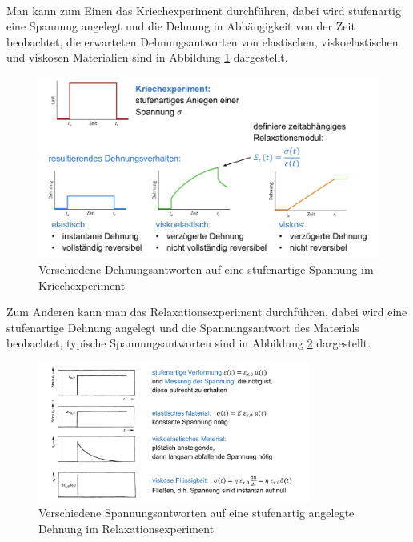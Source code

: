 \documentclass[11pt,a4paper]{article}
\numberwithin{equation}{section}
\numberwithin{figure}{section}
\begin{document}
\\
\begin{addmargin}[25pt]{0pt}
Man kann zum Einen das Kriechexperiment durchführen, dabei wird stufenartig eine Spannung angelegt und die Dehnung in Abhängigkeit von der Zeit beobachtet, die erwarteten Dehnungsantworten von elastischen, viskoelastischen und viskosen Materialien sind in Abbildung \ref{fig:Kriechexperiment} dargestellt.
\begin{figure}[h]
    \centering
    \includegraphics[width = \textwidth]{images/Materialwissenschaften/Kriechexperiment.jpeg}
    \caption{Verschiedene Dehnungsantworten auf eine stufenartige Spannung im Kriechexperiment}
    \label{fig:Kriechexperiment}
\end{figure}
Zum Anderen kann man das Relaxationsexperiment durchführen, dabei wird eine stufenartige Dehnung angelegt und die Spannungsantwort des Materials beobachtet, typische Spannungsantworten sind in Abbildung \ref{fig:Relaxationsexperiment} dargestellt.
\begin{figure}[h]
    \centering
    \includegraphics[width = 0.8\textwidth]{images/Materialwissenschaften/Relaxationsexperiment.jpeg}
    \caption{Verschiedene Spannungsantworten auf eine stufenartig angelegte Dehnung im Relaxationsexperiment}
    \label{fig:Relaxationsexperiment}
\end{figure}
\end{addmargin}
\end{document}
